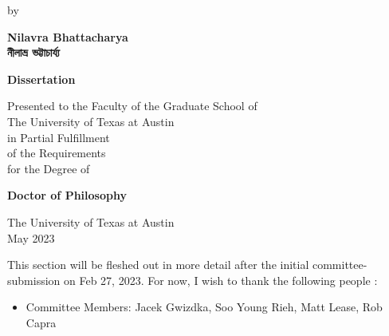 \documentclass[letterpaper, nobind]{templates/ociamthesis}
\providecommand{\tightlist}{%
  \setlength{\itemsep}{0pt}\setlength{\parskip}{0pt}}
\begin{document}
\begin{romanpages}
\begin{center}
  \vspace*{24pt}

  \begin{spacing}{1.4}
    by\\
    
    \vspace*{24pt}
    
    {\Large{\textbf{
      Nilavra Bhattacharya\\
      \vspace*{10pt}
      {\Huge {\secondlanguage নীলাভ্র ভট্টাচার্য্য}}
    }}}
    
    \vspace*{72pt}
    
    {\Large{\textbf{Dissertation}}}\\
    
    \vspace*{24pt}
    
    Presented to the Faculty of the Graduate School of\\
    The University of Texas at Austin\\
    in Partial Fulfillment\\
    of the Requirements\\
    for the Degree of\\
    
    \vspace*{30pt}
    
    {\Large{\textbf{Doctor of Philosophy}}}\\
    
    \vfill

    {\large{The University of Texas at Austin\\
    May 2023}}

  \end{spacing}
\end{center}







\begin{acknowledgements}
 	This section will be fleshed out in more detail after the initial committee-submission on Feb 27, 2023.
 For now, I wish to thank the following people :

 \begin{itemize}
 \tightlist
 \item
   Committee Members: Jacek Gwizdka, Soo Young Rieh, Matt Lease, Rob Capra
 \end{itemize}
\end{acknowledgements}




\end{romanpages}
\end{document}
